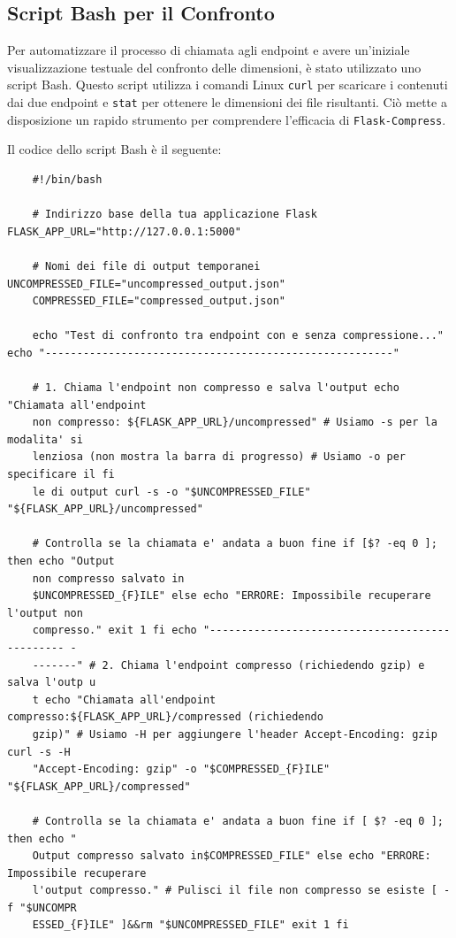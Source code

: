 \subsection{Script Bash per il Confronto}
Per automatizzare il processo di chiamata agli endpoint e avere un'iniziale
visualizzazione testuale del confronto delle dimensioni, è stato utilizzato uno script
Bash. Questo script utilizza i comandi Linux \texttt{curl} per scaricare i contenuti
dai due endpoint e \texttt{stat} per ottenere le dimensioni dei file risultanti.
Ciò mette a disposizione un rapido strumento per comprendere l'efficacia di \texttt{Flask-Compress}.

Il codice dello script Bash è il seguente:

\begin{longlisting}
  \caption{Script Bash per confrontare gli endpoint}
  \label{lst:bash_compare_endpoints}
  \begin{verbatim}
    #!/bin/bash

    # Indirizzo base della tua applicazione Flask FLASK_APP_URL="http://127.0.0.1:5000"

    # Nomi dei file di output temporanei UNCOMPRESSED_FILE="uncompressed_output.json"
    COMPRESSED_FILE="compressed_output.json"

    echo "Test di confronto tra endpoint con e senza compressione..." echo "-------------------------------------------------------"

    # 1. Chiama l'endpoint non compresso e salva l'output echo "Chiamata all'endpoint
    non compresso: ${FLASK_APP_URL}/uncompressed" # Usiamo -s per la modalita' si
    lenziosa (non mostra la barra di progresso) # Usiamo -o per specificare il fi
    le di output curl -s -o "$UNCOMPRESSED_FILE" "${FLASK_APP_URL}/uncompressed"

    # Controlla se la chiamata e' andata a buon fine if [$? -eq 0 ]; then echo "Output
    non compresso salvato in
    $UNCOMPRESSED_{F}ILE" else echo "ERRORE: Impossibile recuperare l'output non
    compresso." exit 1 fi echo "----------------------------------------------- -
    -------" # 2. Chiama l'endpoint compresso (richiedendo gzip) e salva l'outp u
    t echo "Chiamata all'endpoint compresso:${FLASK_APP_URL}/compressed (richiedendo
    gzip)" # Usiamo -H per aggiungere l'header Accept-Encoding: gzip curl -s -H
    "Accept-Encoding: gzip" -o "$COMPRESSED_{F}ILE" "${FLASK_APP_URL}/compressed"

    # Controlla se la chiamata e' andata a buon fine if [ $? -eq 0 ]; then echo "
    Output compresso salvato in$COMPRESSED_FILE" else echo "ERRORE: Impossibile recuperare
    l'output compresso." # Pulisci il file non compresso se esiste [ -f "$UNCOMPR
    ESSED_{F}ILE" ]&&rm "$UNCOMPRESSED_FILE" exit 1 fi


\end{verbatim}
\end{longlisting}
